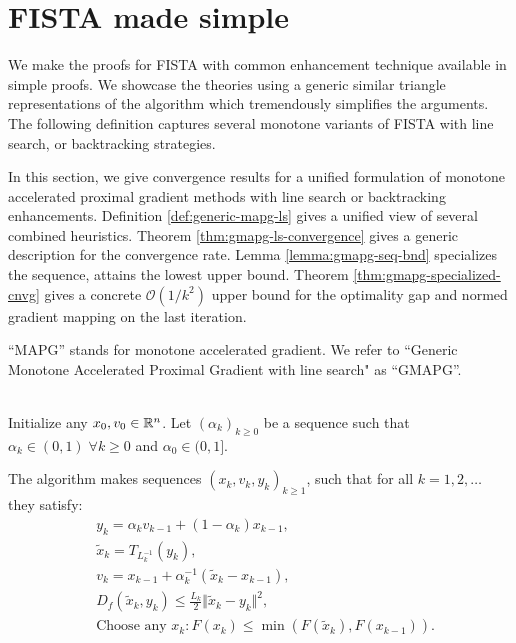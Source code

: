 \documentclass[12pt]{report}
\begin{document}
    \section{FISTA made simple}
        We make the proofs for FISTA  with common enhancement technique available in simple proofs. 
        We showcase the theories using a generic similar triangle representations of the algorithm which tremendously simplifies the arguments. 
        The following definition captures several monotone variants of FISTA with line search,  or backtracking strategies.
        \par
        In this section, we give convergence results for a unified formulation of monotone accelerated proximal gradient methods with line search or backtracking enhancements. 
        Definition \ref{def:generic-mapg-ls} gives a unified view of several combined heuristics. 
        Theorem \ref{thm:gmapg-ls-convergence} gives a generic description for the convergence rate. 
        Lemma \ref{lemma:gmapg-seq-bnd} specializes the sequence, attains the lowest upper bound. 
        Theorem \ref{thm:gmapg-specialized-cnvg} gives a concrete $\mathcal O(1/k^2)$ upper bound for the optimality gap and normed gradient mapping on the last iteration. 
        \par
        ``MAPG'' stands for monotone accelerated gradient. 
        We refer to ``Generic Monotone Accelerated Proximal Gradient with line search" as ``GMAPG''. 
        \begin{definition}[GMAPG]\label{def:generic-mapg-ls}\;\\ 
            Initialize any $x_0, v_0 \in \mathbb R^n$. 
            Let $(\alpha_k)_{k \ge 0}$ be a sequence such that $\alpha_k \in (0, 1) \;\forall k \ge 0$ and $\alpha_0 \in (0, 1]$. 
            \begin{tcolorbox}
                The algorithm makes sequences $(x_k, v_k, y_k)_{k \ge 1}$, such that for all $k = 1, 2, \ldots$ they satisfy: 
                \begin{align*}
                    & y_k = \alpha_k v_{k - 1} + (1 - \alpha_k) x_{k - 1}, \\
                    & \tilde x_k = T_{L_k^{-1}}(y_{k}), \\ 
                    & v_k = x_{k - 1} + \alpha_k^{-1}(\tilde x_k - x_{k - 1}), \\
                    & D_{f}(\tilde x_k, y_k) \le \frac{L_k}{2}\Vert \tilde x_k - y_k\Vert^2, \\
                    & \text{Choose any } x_k: F(x_k) \le \min(F(\tilde x_k), F(x_{k - 1})). 
                \end{align*}    
            \end{tcolorbox}
        \end{definition}
\end{document}
